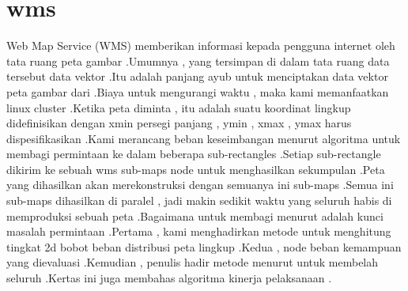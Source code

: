 \section{wms}
Web Map Service (WMS) memberikan informasi kepada pengguna internet oleh tata ruang peta gambar .Umumnya , yang tersimpan di dalam tata ruang data tersebut data vektor .Itu adalah panjang ayub untuk menciptakan data vektor peta gambar dari .Biaya untuk mengurangi waktu , maka kami memanfaatkan linux cluster .Ketika peta diminta , itu adalah suatu koordinat lingkup didefinisikan dengan xmin persegi panjang , ymin , xmax , ymax harus dispesifikasikan .Kami merancang beban keseimbangan menurut algoritma untuk membagi permintaan ke dalam beberapa sub-rectangles .Setiap sub-rectangle dikirim ke sebuah wms sub-maps node untuk menghasilkan sekumpulan .Peta yang dihasilkan akan merekonstruksi dengan semuanya ini sub-maps .Semua ini sub-maps dihasilkan di paralel , jadi makin sedikit waktu yang seluruh habis di memproduksi sebuah peta .Bagaimana untuk membagi menurut adalah kunci masalah permintaan .Pertama , kami menghadirkan metode untuk menghitung tingkat 2d bobot beban distribusi peta lingkup .Kedua , node beban kemampuan yang dievaluasi .Kemudian , penulis hadir metode menurut untuk membelah seluruh .Kertas ini juga membahas algoritma kinerja pelaksanaan .

